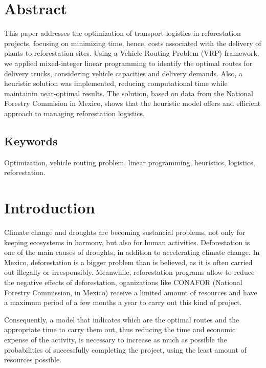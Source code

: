 \documentclass{amsart}
\begin{document}
\section*{Abstract}
    This paper addresses the optimization of transport logistics in reforestation projects, focusing on minimizing time, hence, costs associated with the delivery of plants to reforestation sites. Using a Vehicle Routing Problem (VRP) framework, we applied mixed-integer linear programming to identify the optimal routes for delivery trucks, considering vehicle capacities and delivery demands. Also, a heuristic solution was implemented, reducing computational time while maintainin near-optimal results. The solution, based on data from the National Forestry Commision in Mexico, shows that the heuristic model offers and efficient approach to managing reforestation logistics.
    
{\small \subsection*{Keywords} Optimization, vehicle routing problem, linear programming, heuristics, logistics, reforestation.}



    \section{Introduction}
        Climate change and droughts are becoming sustancial problems, not only for keeping ecosystems in harmony, but also for human activities. Deforestation is one of the main causes of droughts, in addition to accelerating climate change. In Mexico, deforestation is a bigger problem than is believed, as it is often carried out illegally or irresponsibly. Meanwhile, reforestation programs allow to reduce the negative effects of deforestation, oganizations like CONAFOR (National Forestry Commission, in Mexico) receive a limited amount of resources and have a maximum period of a few months a year to carry out this kind of project.

         Consequently, a model that indicates which are the optimal routes and the appropriate time to carry them out, thus reducing the time and economic expense of the activity, is necessary to increase as much as possible the probabilities of successfully completing the project, using the least amount of resources possible.
         
\end{document}
